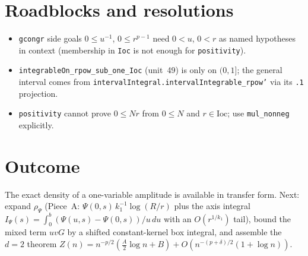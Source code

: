 \documentclass[11pt]{article}
\begin{document}
\section{Roadblocks and resolutions}
\begin{itemize}
\item \texttt{gcongr} side goals $0\le u^{-1}$, $0\le r^{p-1}$ need $0<u$, $0<r$ as named hypotheses in
context (membership in \texttt{Ioc} is not enough for \texttt{positivity}).
\item \texttt{integrableOn\_rpow\_sub\_one\_Ioc} (unit~49) is only on $(0,1]$; the general interval
comes from \texttt{intervalIntegral.intervalIntegrable\_rpow'} via its \texttt{.1} projection.
\item \texttt{positivity} cannot prove $0\le Nr$ from $0\le N$ and $r\in\mathrm{Ioc}$; use
\texttt{mul\_nonneg} explicitly.
\end{itemize}

\section{Outcome}
The exact density of a one-variable amplitude is available in transfer form. Next: expand
$\rho_\Psi$ (Piece~A: $\Psi(0,s)\,k_1^{-1}\log(R/r)$ plus the axis integral
$I_\Psi(s)=\int_0^b(\Psi(u,s)-\Psi(0,s))/u\,du$ with an $O(r^{1/k_1})$ tail), bound the mixed term
$uvG$ by a shifted constant-kernel box integral, and assemble the $d=2$ theorem
$Z(n)=n^{-p/2}(\tfrac A2\log n+B)+O(n^{-(p+\delta)/2}(1+\log n))$.
\end{document}
